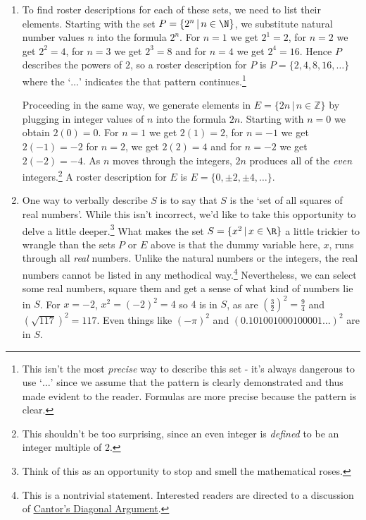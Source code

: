 \documentclass{ximera}
\begin{document}
\begin{example}
\begin{enumerate}
\item  To find roster descriptions for each of these sets, we need to list their elements.   Starting with the set $P = \{ 2^{n} \, | \, n \in \N \}$, we substitute natural number values $n$ into the formula $2^n$.  For $n = 1$ we get $2^1 = 2$,  for $n = 2$ we get $2^2 = 4$, for $n = 3$ we get $2^3 = 8$ and for $n = 4$ we get $2^4 = 16$.  Hence  $P$ describes the powers of $2$, so a roster description for $P$ is $P = \{ 2, 4, 8, 16, \ldots \}$ where the `$\ldots$' indicates the that pattern continues.\footnote{This isn't the most \textit{precise} way to describe this set - it's always dangerous to use `$\ldots$' since we assume that the pattern is clearly demonstrated and thus made evident to the reader.  Formulas are more precise because the pattern is clear.}  

\smallskip

Proceeding in the same way, we generate elements in $E = \{ 2n \, | \, n \in \mathbb Z \}$ by plugging in integer values of $n$ into the formula $2n$.  Starting with $n = 0$ we obtain $2(0) = 0$.  For $n = 1$ we get $2(1) = 2$, for $n = -1$ we get $2(-1) = -2$ for $n = 2$, we get $2(2) = 4$ and for $n = -2$ we get $2(-2) = -4$.  As $n$  moves through the integers, $2n$ produces all of the \textit{even} integers.\footnote{This shouldn't be too surprising, since an even integer is \textit{defined} to be an integer multiple of $2$.} A roster description for  $E$ is $E = \{ 0, \pm 2, \pm 4, \ldots \}$.

\item  One way to verbally describe $S$ is to say that $S$ is the `set of all squares of real numbers'.  While this isn't incorrect, we'd like to take this opportunity to delve a little deeper.\footnote{Think of this as an opportunity to stop and smell the mathematical roses.}  What makes the set $S = \{ x^2 \, | \, x \in \R \}$ a little trickier to wrangle than the sets $P$ or $E$ above is that the dummy variable here, $x$, runs through all \textit{real} numbers.  Unlike the natural numbers or the integers, the real numbers cannot be listed in any methodical way.\footnote{This is a nontrivial statement.  Interested readers are directed to a discussion of \href{http://en.wikipedia.org/wiki/Cantor's_diagonal_argument}{\underline{Cantor's Diagonal Argument}}.}  Nevertheless, we can select some real numbers, square them and get a sense of what kind of numbers lie in $S$.  For $x = -2$, $x^2 = (-2)^2 = 4$ so $4$ is in $S$, as are $\left(\frac{3}{2}\right)^2 = \frac{9}{4}$ and $(\sqrt{117})^2 = 117$.  Even things like $(-\pi)^2$ and $(0.101001000100001 \ldots)^2$ are in $S$.  


\end{enumerate}
\end{example}
\end{document}
